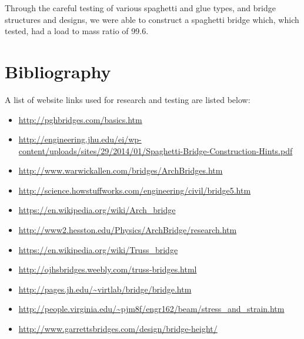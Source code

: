 \documentclass[a4paper,11pt]{article}
\begin{document}
Through the careful testing of various spaghetti and glue types, and bridge
structures and designs, we were able to construct a spaghetti bridge which,
which tested, had a load to mass ratio of 99.6.



\section{Bibliography}

A list of website links used for research and testing are listed below:

\begin{itemize}
\item \url{http://pghbridges.com/basics.htm}
\item \url{http://engineering.jhu.edu/ei/wp-content/uploads/sites/29/2014/01/Spaghetti-Bridge-Construction-Hints.pdf}
\item \url{http://www.warwickallen.com/bridges/ArchBridges.htm}
\item \url{http://science.howstuffworks.com/engineering/civil/bridge5.htm}
\item \url{https://en.wikipedia.org/wiki/Arch_bridge}
\item \url{http://www2.hesston.edu/Physics/ArchBridge/research.htm}
\item \url{https://en.wikipedia.org/wiki/Truss_bridge}
\item \url{http://ojhsbridges.weebly.com/truss-bridges.html}
\item \url{http://pages.jh.edu/~virtlab/bridge/bridge.htm}
\item \url{http://people.virginia.edu/~pjm8f/engr162/beam/stress_and_strain.htm}
\item \url{http://www.garrettsbridges.com/design/bridge-height/}
\end{itemize}
\end{document}
